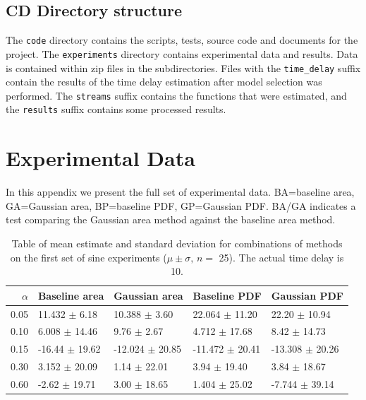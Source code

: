 \documentclass[a4paper,11pt,twoside]{article}
\begin{document}
\begin{appendices}
\subsection{CD Directory structure}
\label{sec-10-4}

   The \texttt{code} directory contains the scripts, tests, source code and
   documents for the project. The \texttt{experiments} directory contains
   experimental data and results. Data is contained within zip files in the
   subdirectories. Files with the \texttt{time\_delay} suffix contain the
   results of the time delay estimation after model selection was performed. The
   \texttt{streams} suffix contains the functions that were estimated, and the
   \texttt{results} suffix contains some processed results.
\section{Experimental Data}
\label{sec-11}

  In this appendix we present the full set of experimental data. BA=baseline area,
  GA=Gaussian area, BP=baseline PDF, GP=Gaussian PDF. BA/GA indicates a test
  comparing the Gaussian area method against the baseline area method.

  \begin{table}[htb]

  \begin{center}
  \begin{tabular}{r|llll}
  $\alpha$  &  Baseline area       &  Gaussian area        &  Baseline PDF         &  Gaussian PDF         \\
  \hline
  0.05  &  11.432 $\pm$ 6.18   &  10.388 $\pm$ 3.60    &  22.064 $\pm$ 11.20   &  22.20 $\pm$ 10.94    \\
  0.10  &  6.008 $\pm$ 14.46   &  9.76 $\pm$ 2.67      &  4.712 $\pm$ 17.68    &  8.42 $\pm$ 14.73     \\
  0.15  &  -16.44 $\pm$ 19.62  &  -12.024 $\pm$ 20.85  &  -11.472 $\pm$ 20.41  &  -13.308 $\pm$ 20.26  \\
  0.30  &  3.152 $\pm$ 20.09   &  1.14 $\pm$ 22.01     &  3.94 $\pm$ 19.40     &  3.84 $\pm$ 18.67     \\
  0.60  &  -2.62 $\pm$ 19.71   &  3.00 $\pm$ 18.65     &  1.404 $\pm$ 25.02    &  -7.744 $\pm$ 39.14   \\
  \end{tabular}
  \end{center} \caption{Table of mean estimate and standard deviation for
  combinations of methods on the first set of sine experiments ($\mu\pm\sigma,\,
  n=$ 25). The actual time delay is 10.} \label{tbl:sine1}\end{table}



\end{appendices}
\end{document}
